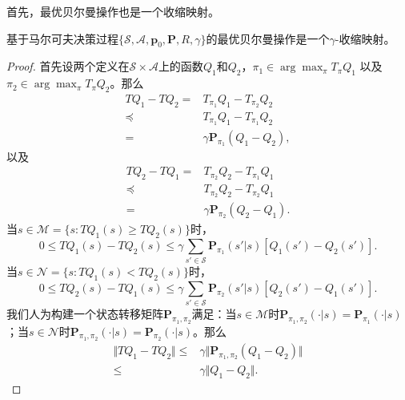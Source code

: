 首先，最优贝尔曼操作也是一个收缩映射。
\begin{lemma}
    基于马尔可夫决策过程$\{\mathcal{S}, \mathcal{A}, \mathbf{p}_0, \mathbf{P}, R, \gamma\}$的最优贝尔曼操作是一个$\gamma$-收缩映射。
\end{lemma}
\begin{proof}
    首先设两个定义在$\mathcal{S}\times\mathcal{A}$上的函数$Q_1$和$Q_2$，$\pi_1 \in \arg\max_{\pi} T_\pi Q_1$ 以及 $\pi_2 \in \arg\max_{\pi} T_{\pi} Q_2$。那么
    \begin{align*}
        TQ_1 - TQ_2 =& T_{\pi_1} Q_1 - T_{\pi_2} Q_2\\
        \preceq& T_{\pi_1} Q_1 - T_{\pi_1} Q_2\\
        =& \gamma \mathbf{P}_{\pi_1}(Q_1 - Q_2),
    \end{align*}
    以及
    \begin{align*}
        TQ_2 - TQ_1 =& T_{\pi_2} Q_2 - T_{\pi_1} Q_1\\
        \preceq& T_{\pi_2} Q_2 - T_{\pi_2} Q_1\\
        =& \gamma \mathbf{P}_{\pi_2}(Q_2 - Q_1).
    \end{align*}
    当$s \in \mathcal{M} = \{s : TQ_1(s) \ge TQ_2(s)\}$时，
    \begin{equation*}
        0 \le TQ_1(s) - TQ_2(s) \le \gamma \sum_{s' \in \mathcal{S}}
        \mathbf{P}_{\pi_1}(s' \vert s) [Q_1(s') - Q_2(s')].
    \end{equation*}
    当$s \in \mathcal{N} = \{s : TQ_1(s) < TQ_2(s)\}$时，
    \begin{equation*}
        0 \le TQ_2(s) - TQ_1(s) \le \gamma \sum_{s' \in \mathcal{S}}
        \mathbf{P}_{\pi_2}(s' \vert s) [Q_2(s') - Q_1(s')].
    \end{equation*}
    我们人为构建一个状态转移矩阵$\mathbf{P}_{\pi_1, \pi_2}$满足：当$s \in \mathcal{M}$时$\mathbf{P}_{\pi_1, \pi_2}(\cdot \vert s) = \mathbf{P}_{\pi_1}(\cdot \vert s)$；当$s \in \mathcal{N}$时$\mathbf{P}_{\pi_1, \pi_2}(\cdot \vert s) = \mathbf{P}_{\pi_2}(\cdot \vert s)$。那么
    \begin{align*}
        \Vert TQ_1 - TQ_2 \Vert \le& \gamma
        \Vert \mathbf{P}_{\pi_1, \pi_2}(Q_1 - Q_2) \Vert\\
        \le& \gamma \Vert Q_1 - Q_2 \Vert.
    \end{align*}
\end{proof}

